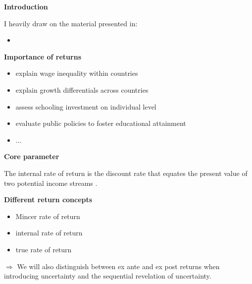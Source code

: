 \begin{frame}\begin{center}
\LARGE\textbf{Introduction}
\end{center}\end{frame}
\begin{frame} I heavily draw on the material presented in:

\begin{itemize}
\item {}
\end{itemize}

\end{frame}
\begin{frame}\textbf{Importance of returns}\vspace{0.3cm}

\begin{itemize}\setlength\itemsep{1em}
\item explain wage inequality within countries
\item explain growth differentials across countries
\item assess schooling investment on individual level
\item evaluate public policies to foster educational attainment
\item ...
\end{itemize}
\end{frame}
\begin{frame}\textbf{Core parameter}\vspace{0.3cm}

The internal rate of return is the  discount rate that equates the present value of two potential income streams \cite{Becker.1964}.

\end{frame}
\begin{frame}\textbf{Different return concepts}\vspace{0.3cm}

\begin{itemize}\setlength\itemsep{1em}
\item Mincer rate of return
\item internal rate of return
\item true rate of return
\end{itemize}\vspace{0.3cm}

$\Rightarrow$  We will also distinguish between ex ante and ex post returns when introducing uncertainty and the sequential revelation of uncertainty.

\end{frame}

